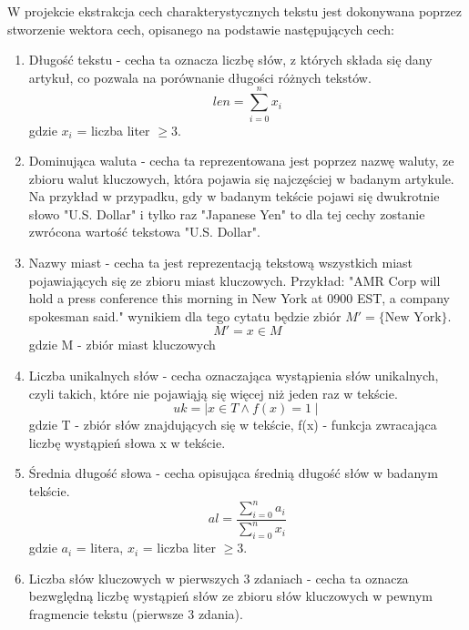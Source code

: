\documentclass{article}
\begin{document}
W projekcie ekstrakcja cech charakterystycznych tekstu jest dokonywana poprzez stworzenie wektora cech, opisanego na podstawie następujących cech:
\begin{enumerate}
    \item Długość tekstu - cecha ta oznacza liczbę słów, z których składa się dany artykuł, co pozwala na porównanie długości różnych tekstów.
        \begin{equation}
            len = \sum_{i=0}^{n} x_i
        \end{equation}
        gdzie \( x_i \) = liczba liter \( \geq 3 \).
    \item Dominująca waluta - cecha ta reprezentowana jest poprzez nazwę waluty, ze zbioru walut kluczowych, która pojawia się najczęściej w badanym artykule. Na przykład w przypadku, gdy w badanym tekście pojawi się dwukrotnie słowo "U.S. Dollar" i tylko raz "Japanese Yen" to dla tej cechy zostanie zwrócona wartość tekstowa "U.S. Dollar".
    \item Nazwy miast - cecha ta jest reprezentacją tekstową wszystkich miast pojawiających się ze zbioru miast kluczowych. Przykład: "AMR Corp will hold a press conference this morning in New York at 0900 EST, a company spokesman said." wynikiem dla tego cytatu będzie zbiór \( M' = \{ \text{New York} \} \). 
        \begin{equation}
            M' =  x \in M 
        \end{equation}
        gdzie M - zbiór miast kluczowych
    \item Liczba unikalnych słów - cecha oznaczająca wystąpienia słów unikalnych, czyli takich, które nie pojawiąją się więcej niż jeden raz w tekście.
        \begin{equation}
            uk = \mid x \in T \land f(x) = 1 \mid
        \end{equation}
        gdzie T - zbiór słów znajdujących się w tekście, f(x) - funkcja zwracająca liczbę wystąpień słowa x w tekście.
    \item Średnia długość słowa - cecha opisująca średnią długość słów w badanym tekście.
     \begin{equation}
            al = \frac{\sum_{i=0}^{n} a_i}{\sum_{i=0}^{n} x_i}
        \end{equation}
        gdzie \( a_i \) = litera, \( x_i \) = liczba liter \( \geq 3 \).
    \item Liczba  słów kluczowych w pierwszych 3 zdaniach - cecha ta oznacza bezwględną liczbę wystąpień słów ze zbioru słów kluczowych w pewnym fragmencie tekstu (pierwsze 3 zdania).

\end{enumerate}
\end{document}
